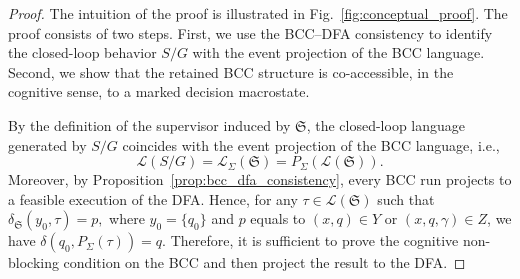 \documentclass[final,5p,times,twocolumn,authoryear]{elsarticle}
\begin{document}
\begin{proof}
The intuition of the proof is illustrated in Fig.~\ref{fig:conceptual_proof}. The proof consists of two steps.
First, we use the BCC--DFA consistency to identify the closed-loop behavior $S/G$ with the event projection of the BCC language.
Second, we show that the retained BCC structure is co-accessible, in the cognitive sense, to a marked decision macrostate.

By the definition of the supervisor induced by $\mathfrak{S}$, the closed-loop language generated by $S / G$ coincides with the event projection of the
BCC language, i.e.,
\begin{equation}\label{eq:proof_cnb_lang_equiv}
    \mathcal{L}(S/G) = \mathcal{L}_{\Sigma}(\mathfrak{S})
                     = P_{\Sigma}(\mathcal{L}(\mathfrak{S})).
\end{equation}
Moreover, by Proposition~\ref{prop:bcc_dfa_consistency}, every BCC run projects to a feasible execution of the DFA. Hence, for any $\tau \in \mathcal{L}(\mathfrak{S})$ such that
$
    \delta_{\mathfrak{S}}(y_0, \tau) = p,
$
where $y_0 = \{ q_0 \}$ and $p$ equals to $(x, q) \in Y$ or $(x, q, \gamma) \in Z$,
we have
$
    \delta(q_0, P_\Sigma(\tau)) = q.
$
Therefore, it is sufficient to prove the cognitive non-blocking condition on the BCC and then project the result to the DFA.


\end{proof}
\end{document}
